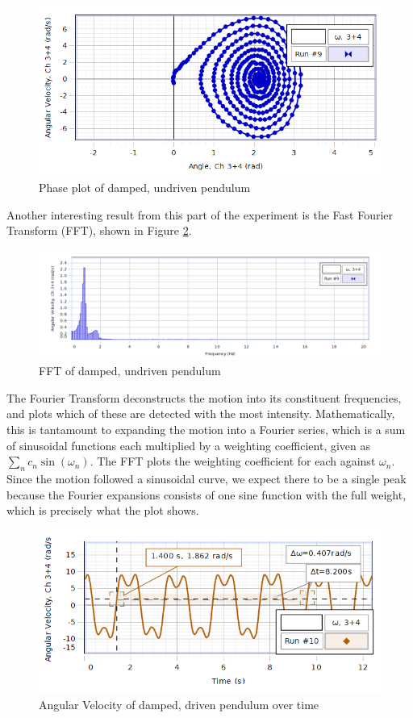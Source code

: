 \documentclass[twocolumn,amsmath,amssymb,pra, floatfix]{revtex4-2}
\begin{document}
\begin{figure}[H]
    \centering
    \includegraphics[width = 0.7\linewidth]{images/ResonantFreqOmegavsAngle.PNG}
    \caption{Phase plot of damped, undriven pendulum}
    \label{fig: phase plot damped pendulum}
\end{figure}

Another interesting result from this part of the experiment is the Fast Fourier Transform (FFT), shown in Figure \ref{fig: FFT damped pendulum}.

\begin{figure}[H]
    \centering
    \includegraphics[width = 0.7\linewidth]{images/ResonantFreqFFT.PNG}
    \caption{FFT of damped, undriven pendulum}
    \label{fig: FFT damped pendulum}
\end{figure}

The Fourier Transform deconstructs the motion into its constituent frequencies, and plots which of these are detected with the most intensity. Mathematically, this is tantamount to expanding the motion into a Fourier series, which is a sum of sinusoidal functions each multiplied by a weighting coefficient, given as $\sum_{n} c_{n} \sin(\omega_{n})$. The FFT plots the weighting coefficient for each against $\omega_{n}$. Since the motion followed a sinusoidal curve, we expect there to be a single peak because the Fourier expansions consists of one sine function with the full weight, which is precisely what the plot shows. 

\begin{figure}[H]
    \centering
    \includegraphics[width = 0.7\linewidth]{images/NonChaoticOmegavsTime.PNG}
    \caption{Angular Velocity of damped, driven pendulum over time}
    \label{fig: damped driven pendulum}
\end{figure}
\end{document}
